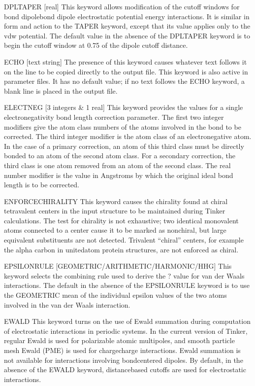 \documentclass[letterpaper,11pt,english]{sphinxmanual}
\begin{document}
DPL\sphinxhyphen{}TAPER {[}real{]}     This keyword allows modification of the cutoff windows for bond dipole\sphinxhyphen{}bond dipole electrostatic potential energy interactions. It is similar in form and action to the TAPER keyword, except that its value applies only to the vdw potential. The default value in the absence of the DPL\sphinxhyphen{}TAPER keyword is to begin the cutoff window at 0.75 of the dipole cutoff distance.

ECHO {[}text string{]}     The presence of this keyword causes whatever text follows it on the line to be copied directly to the output file. This keyword is also active in parameter files. It has no default value; if no text follows the ECHO keyword, a blank line is placed in the output file.

ELECTNEG {[}3 integers \& 1 real{]}     This keyword provides the values for a single electronegativity bond length correction parameter. The first two integer modifiers give the atom class numbers of the atoms involved in the bond to be corrected. The third integer modifier is the atom class of an electronegative atom. In the case of a primary correction, an atom of this third class must be directly bonded to an atom of the second atom class. For a secondary correction, the third class is one atom removed from an atom of the second class. The real number modifier is the value in Angstroms by which the original ideal bond length is to be corrected.

ENFORCE\sphinxhyphen{}CHIRALITY     This keyword causes the chirality found at chiral tetravalent centers in the input structure to be maintained during Tinker calculations. The test for chirality is not exhaustive; two identical monovalent atoms connected to a center cause it to be marked as non\sphinxhyphen{}chiral, but large equivalent substituents are not detected. Trivalent “chiral” centers, for example the alpha carbon in united\sphinxhyphen{}atom protein structures, are not enforced as chiral.

EPSILONRULE {[}GEOMETRIC/ARITHMETIC/HARMONIC/HHG{]}     This keyword selects the combining rule used to derive the ? value for van der Waals interactions. The default in the absence of the EPSILONRULE keyword is to use the GEOMETRIC mean of the individual epsilon values of the two atoms involved in the van der Waals interaction.

EWALD     This keyword turns on the use of Ewald summation during computation of electrostatic interactions in periodic systems. In the current version of Tinker, regular Ewald is used for polarizable atomic multipoles, and smooth particle mesh Ewald (PME) is used for charge\sphinxhyphen{}charge interactions. Ewald summation is not available for interactions involving bond\sphinxhyphen{}centered dipoles. By default, in the absence of the EWALD keyword, distance\sphinxhyphen{}based cutoffs are used for electrostatic interactions.
\end{document}
